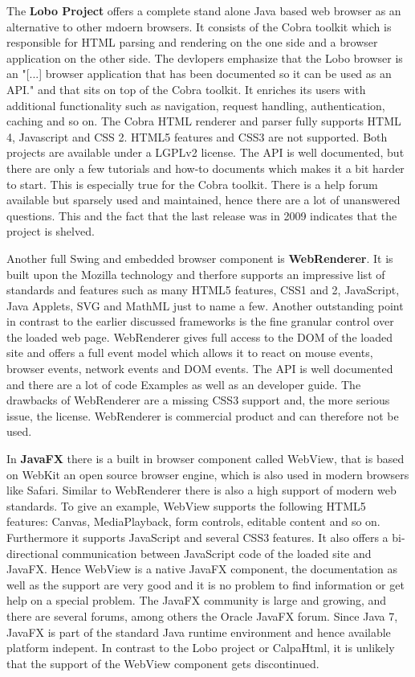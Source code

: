 
The \textbf{Lobo Project} offers a complete stand alone Java based web browser as an alternative to other mdoern browsers.
It consists of the Cobra toolkit which is responsible for HTML parsing and rendering on the one side and a browser application on the other side.
The devlopers emphasize that the Lobo browser is an "[...]  browser application that has been documented so it can be used as an API." \autocite{tech-ana:lobo} and that sits on top of the Cobra toolkit.
It enriches its users with additional functionality such as navigation, request handling, authentication, caching and so on.
The Cobra HTML renderer and parser fully supports HTML 4, Javascript and CSS 2.
HTML5 features and CSS3 are not supported.
Both projects are available under a LGPLv2 license.
The API is well documented, but there are only a few tutorials and how-to documents which makes it a bit harder to start.
This is especially true for the Cobra toolkit.
There is a help forum available but sparsely used and maintained, hence there are a lot of unanswered questions.
This and the fact that the last release was in 2009 indicates that the project is shelved.



Another full Swing and embedded browser component is \textbf{WebRenderer}.
It is built upon the Mozilla technology and therfore supports an impressive list of standards and features such as many HTML5 features, CSS1 and 2, JavaScript, Java Applets, SVG and MathML just to name a few.
Another outstanding point in contrast to the earlier discussed frameworks is the fine granular control over the loaded web page.
WebRenderer gives full access to the DOM of the loaded site and offers a full event model which allows it to react on mouse events, browser events, network events and DOM events.
The API is well documented and there are a lot of code Examples as well as an developer guide.
The drawbacks of WebRenderer are a missing CSS3 support and, the more serious issue, the license.
WebRenderer is commercial product and can therefore not be used.



In \textbf{JavaFX} there is a built in browser component called WebView, that is based on WebKit an open source browser engine, which is also used in modern browsers like Safari.
Similar to WebRenderer there is also a high support of modern web standards.
To give an example, WebView supports the following HTML5 features: Canvas, MediaPlayback, form controls, editable content and so on.
Furthermore it supports JavaScript and several CSS3 features.
It also offers a bi-directional communication between JavaScript code of the loaded site and JavaFX.
Hence WebView is a native JavaFX component, the documentation as well as the support are very good and it is no problem to find information or get help on a special problem.
The JavaFX community is large and growing, and there are several forums, among others the Oracle JavaFX forum.
Since Java 7, JavaFX is part of the standard Java runtime environment and hence available platform indepent.
In contrast to the Lobo project or CalpaHtml, it is unlikely that the support of the WebView component gets discontinued.

